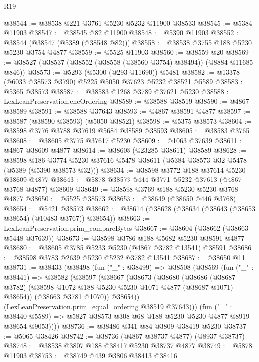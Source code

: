 \begin{lexlean}{R19}
\begin{coremodule}
@38544 := @38538 @221 @3761 @5230 @5232 @11900 @38533
@38545 := @5384 @11903
@38547 := @38545 @82 @11900
@38548 := @5390 @11903
@38552 := @38544 (@38547 (@5389 (@38548 @82)))
@38558 := @38538 @3755 @188 @5230 @5230 @3754 @4877
@38559 := @5525 @11903
@38560 := @38559 @20
@38569 := @38527 (@38537 (@38552 (@38558 (@38560 @3754) @38494)) (@8884 @11685 @846))
@38573 := @5293 (@5300 (@293 @11690)) @5481
@38582 := @13378 (@6033 @38573 @3790) @5225 @5050 @37623 @5232 @38521 @5589
@38583 := @5365 @38573
@38587 := @38583 @1268 @3789 @37621 @5230
@38588 := LexLeanPreservation.encOrdering
@38589 := @38588 @38519
@38590 := @4867 @38589
@38591 := @38588 @37643
@38593 := @4867 @38591 @4877
@38597 := @38587 (@38590 @38593) (@5050 @38521)
@38598 := @5375 @38573
@38604 := @38598 @3776 @3788 @37619 @5684 @38589 @38593
@38605 := @38583 @3765
@38608 := @38605 @3775 @37617 @5230
@38609 := @1063 @37639
@38611 := @4867 @38609 @4877
@38614 := @38608 (@23285 @38611) @38589
@38628 := @38598
    @186
    @3774
    @5230
    @37616
    @5478
    @38611
    (@5384 @38573 @32 @5478 (@5389 (@5390 @38573 @32)))
@38634 := @38598 @3772 @188 @37614 @5230 @38609 @4877
@38643 := @5878 @38573 @444 @3771 @5232 @37613 (@4867 @3768 @4877) @38609
@38649 := @38598 @3769 @188 @5230 @5230 @3768 @4877
@38650 := @5525 @38573
@38653 := @38649 (@38650 @446 @3768)
@38654 := @5421 @38573
@38662 := @38614 (@38628 (@38634 (@38643 (@38653 @38654) (@10483 @3767)) @38654))
@38663 := LexLeanPreservation.prim_compareBytes
@38667 := @38604 (@38662 (@38663 @5448 @37639))
@38673 := @38598 @3786 @188 @5682 @5230 @38591 @4877
@38680 := @38605 @3785 @5233 @5230 (@4867 @3782 @13541) @38591
@38686 := @38598 @3783 @2639 @5230 @5232 @3782 @13541
@38687 := @38650 @11
@38731 := @38433
    (@38498
      (fun ("_" : @38499) =>
      @38508
        (@38569
          (fun ("_" : @38441) =>
          @38582
            (@38597
              (@38667
                (@38673
                  (@38680
                    (@38686
                      (@38687 @3782)
                      (@38598 @1072 @188 @5230 @5230 @1071 @4877 (@38687 @1071) @38654))
                    (@38663 @3781 @1070))
                  @38654))
              (LexLeanPreservation.prim_equal_ordering @38519 @37643)))
          (fun ("_" : @38440 @5589) =>
          @5827 @38573 @308 @68 @188 @5230 @5230 @4877 @8919 @38654 @9053))))
@38736 := @38486 @341 @84 @3809 @38419 @5230
@38737 := @5065 @38426
@38742 := @38736 (@4867 @38737 @4877) (@8937 @38737)
@38748 := @38538 @3807 @188 @38417 @5230 @38737 @4877
@38749 := @5878 @11903
@38753 := @38749 @439 @3806 @38413 @38416

\end{coremodule}
\end{lexlean}
